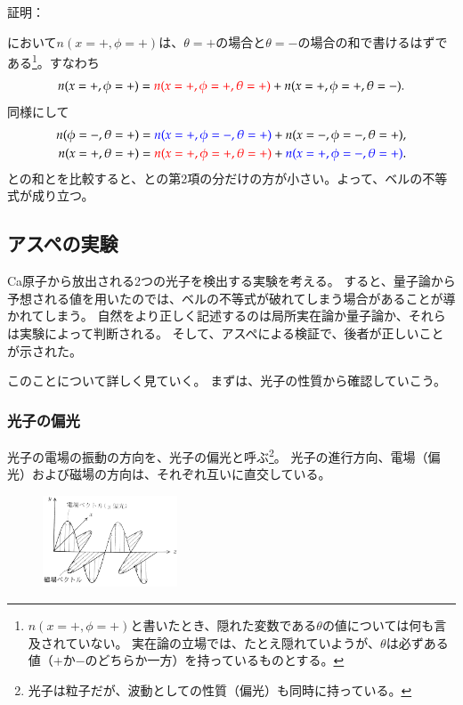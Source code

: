 \documentclass[10pt,b5paper,papersize,dvipdfmx]{jsbook}
\begin{document}
\noindent 証明：\par
{}において$n(x=+,\phi=+)$は、$\theta = +$の場合と$\theta = -$の場合の和で書けるはずである\footnote{
  $n(x=+,\phi=+)$と書いたとき、隠れた変数である$\theta$の値については何も言及されていない。
  実在論の立場では、たとえ隠れていようが、$\theta$は必ずある値（$+$か$-$のどちらか一方）を持っているものとする。
}。すなわち
\begin{align}
  \label{eq:bell-1}
  n(x=+,\phi=+) = \textcolor{red}{n(x=+,\phi=+, \theta=+)} + n(x=+,\phi=+, \theta=-).
\end{align}
同様にして
\begin{align}
  \label{eq:bell-2}
  n(\phi=-,\theta=+) &= \textcolor{blue}{n(x=+, \phi=-,\theta=+)} + n(x=-, \phi=-,\theta=+)
  , \\
  \label{eq:bell-3}
  n(x=+,\theta=+) &= \textcolor{red}{n(x=+, \phi=+, \theta=+)} + \textcolor{blue}{n(x=+, \phi=-, \theta=+)}.
\end{align}
との和とを比較すると、との第2項の分だけの方が小さい。よって、ベルの不等式が成り立つ。
\QED

%
\subsection{アスペの実験} %
Ca原子から放出される2つの光子を検出する実験を考える。
すると、量子論から予想される値を用いたのでは、ベルの不等式が破れてしまう場合があることが導かれてしまう。
自然をより正しく記述するのは局所実在論か量子論か、それらは実験によって判断される。
そして、アスペによる検証で、後者が正しいことが示された。\par
このことについて詳しく見ていく。
まずは、光子の性質から確認していこう。

%
\subsubsection{光子の偏光} %

光子の電場の振動の方向を、光子の偏光と呼ぶ\footnote{
  光子は粒子だが、波動としての性質（偏光）も同時に持っている。
}。
光子の進行方向、電場（偏光）および磁場の方向は、それぞれ互いに直交している。

\begin{figure}[ht]
  \centering
  \includegraphics[width=40mm]{nkym/fig/henkou.jpeg}
\end{figure}
\end{document}
